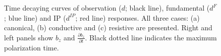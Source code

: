 \documentclass[extra,mreferee]{gji}
\newcommand{\dip}{d^{IP}}
\begin{document}
\begin{figure}
  \caption{Time decaying curves of observation ($d$; black line), fundamental ($d^F$; blue line) and IP ($\dip$; red line) responses. All three cases: (a) canonical, (b) conductive and (c) resistive are presented. Right and left panels show $b_z$ and $\frac{\partial b_z}{\partial t}$. Black dotted line indicates the maximum polarization time.}
  \label{F:Three_IPresp}
\end{figure}
\end{document}
